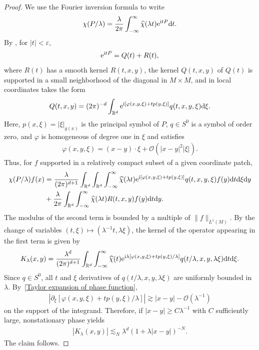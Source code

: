 \documentclass[12pt,reqno]{amsart}
\theoremstyle{definition}
\theoremstyle{remark}
\numberwithin{equation}{section}
\newcommand{\1}{\mathbbm{1}}
\renewcommand{\epsilon}{\varepsilon}
\renewcommand{\phi}{\varphi}
\newcommand{\R}{\mathbb{R}}
\def\rd{\mathrm{d}}
\newcommand{\e}{{\rm e}}
\newcommand\I{\mathrm{i}}
\begin{document}
\begin{proof}
  We use the Fourier inversion formula to write
  \begin{align*}
    \chi(P/\lambda)=\frac{\lambda}{2\pi}\int_{-\infty}^{\infty}\widehat{\chi}(\lambda t)\e^{\I tP}\rd t.
  \end{align*}
  By \cite[Theorem~4.1.2]{Sogge2017}, for $|t|<\epsilon$,
  \begin{align}\label{eq: Q(t)+R(t)}
    \e^{\I tP}=Q(t)+R(t),
  \end{align}
  where $R(t)$ has a smooth kernel $R(t,x,y)$, the kernel $Q(t,x,y)$ of $Q(t)$ is supported in a small neighborhood of the diagonal in $M\times M$, and in local coordinates takes the form
  \[
    Q(t,x,y) = (2\pi)^{-d}\int_{\R^d}\e^{\I[\phi(x,y,\xi)+tp(y,\xi)]}q(t,x,y,\xi)\rd \xi.
  \]
  Here, $p(x,\xi)=|\xi|_{g(x)}$ is the principal symbol of $P$, $q\in S^0$ is a symbol of order zero, and $\phi$ is homogeneous of degree one in $\xi$ and satisfies
  \begin{align}\label{Taylor expansion of phase function}
    \phi(x,y,\xi)=(x-y)\cdot\xi+\mathcal{O}(|x-y|^2|\xi|).
  \end{align}
  Thus, for $f$ supported in a relatively compact subset of a given coordinate patch,
  \begin{align*}
    \chi(P/\lambda)f(x)&=\frac{\lambda}{(2\pi)^{d+1}}\int_{\R^d}\int_{\R^d}\int_{-\infty}^{\infty}\widehat{\chi}(\lambda t)\e^{\I[\phi(x,y,\xi)+tp(y,\xi)]}q(t,x,y,\xi)f(y)\rd t\rd \xi \rd y \\
    & + \frac{\lambda}{2\pi}\int_{\R^d}\int_{-\infty}^{\infty}\widehat{\chi}(\lambda t)R(t,x,y)f(y)\rd t \rd y.
  \end{align*}
  The modulus of the second term is bounded by a multiple of $\|f\|_{L^1(M)}$. 
  By the change of variables $(t,\xi)\mapsto(\lambda^{-1}t,\lambda\xi)$, the kernel of the operator appearing in the first term is given by
  \begin{align*}
    K_{\lambda}(x,y)=\frac{\lambda^d}{(2\pi)^{d+1}}\int_{\R^d}\int_{-\infty}^{\infty}\widehat{\chi}(t)\e^{\I\lambda[\phi(x,y,\xi)+t p(y,\xi)/\lambda]}q(t/\lambda,x,y,\lambda\xi)\rd t\rd \xi. 
  \end{align*}
  Since $q\in S^0$, all $t$ and $\xi$ derivatives of $q(t/\lambda,x,y,\lambda\xi)$ are uniformly bounded in $\lambda$. By~\eqref{Taylor expansion of phase function},
  \begin{align*}
    |\partial_{\xi}[\phi(x,y,\xi)+t p(y,\xi)/\lambda]|\gtrsim |x-y|-\mathcal{O}(\lambda^{-1})
  \end{align*}
  on the support of the integrand.
  Therefore, if $|x-y|\geq C\lambda^{-1}$ with $C$ sufficiently large, nonstationary phase yields
  \begin{align*}
    |K_{\lambda}(x,y)|\lesssim_N %
    \lambda^d (1+\lambda|x-y|)^{-N}.
  \end{align*}
  The claim follows.
\end{proof}
\end{document}
